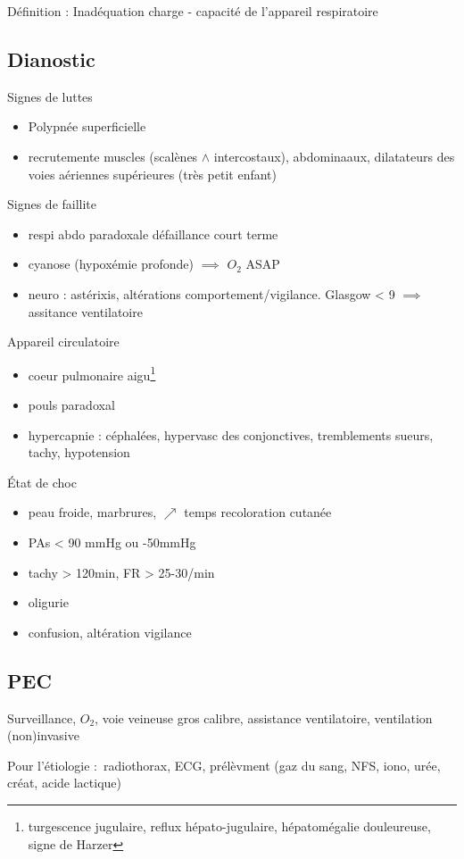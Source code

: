 \documentclass{article}
\begin{document}
Définition : Inadéquation charge - capacité de l'appareil respiratoire

\subsection{Dianostic}
Signes de luttes
\begin{itemize}
  \item Polypnée superficielle
  \item recrutemente muscles (scalènes $\wedge$ intercostaux), abdominaaux,
    dilatateurs des voies aériennes supérieures (très petit enfant)
\end{itemize}
Signes de faillite
\begin{itemize}
  \item respi abdo paradoxale \skull défaillance court terme
  \item cyanose (hypoxémie profonde) $\implies$ $O_2$ ASAP
  \item neuro : astérixis, altérations comportement/vigilance. Glasgow < 9
    $\implies$ assitance ventilatoire
\end{itemize}
Appareil circulatoire
\begin{itemize}
  \item coeur pulmonaire aigu\footnote{turgescence jugulaire, reflux
    hépato-jugulaire, hépatomégalie douleureuse, signe de Harzer}
  \item pouls paradoxal
  \item hypercapnie : {céphalées, hypervasc des conjonctives}, {tremblements
    sueurs, tachy, hypotension}
\end{itemize}
État de choc 
\begin{itemize}
  \item peau froide, marbrures, $\nearrow$ temps recoloration cutanée
  \item PAs < 90 mmHg ou -50mmHg
  \item tachy > 120min, FR > 25-30/min
  \item oligurie
  \item confusion, altération vigilance
\end{itemize}

\subsection{PEC}
Surveillance, $O_2$, voie veineuse gros calibre, assistance ventilatoire,
ventilation (non)invasive

Pour l'étiologie : radiothorax, ECG, prélèvment (gaz du sang, NFS, iono, urée,
créat, acide lactique)
\end{document}
